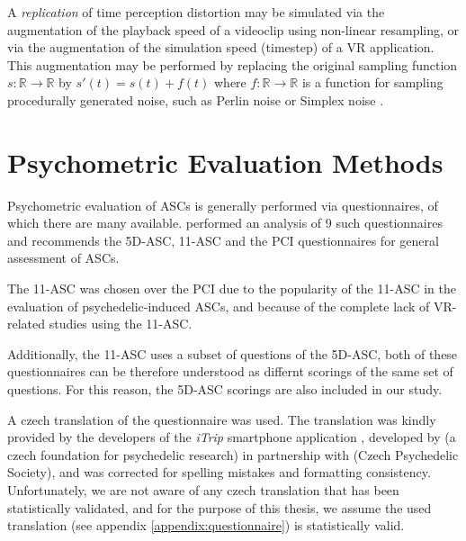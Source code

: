 A \textit{replication} of time perception distortion may be simulated via the augmentation of the playback speed of a videoclip using non-linear resampling, or via the augmentation of the simulation speed (timestep) of a \ac{VR} application. This augmentation may be performed by replacing the original sampling function $s \colon \mathbb{R} \to \mathbb{R}$ by $s'(t) = s(t) + f(t)$ where $f \colon \mathbb{R} \to \mathbb{R}$ is a function for sampling procedurally generated noise, such as Perlin noise \autocite{perlin1985image} or Simplex noise \autocite{olano2002simplex}.

\section{Psychometric Evaluation Methods}
Psychometric evaluation of \acp{ASC} is generally performed via questionnaires, of which there are many available.
\textcites{schmidt2018empirische}{figueiredobuilding} performed an analysis of 9 such questionnaires and recommends the \acf{5D-ASC}, \acf{11-ASC} and the \ac{PCI} questionnaires for general assessment of \acp{ASC}.

The \ac{11-ASC} was chosen over the \ac{PCI} due to the popularity of the \ac{11-ASC} in the evaluation of psychedelic-induced \acp{ASC}, and because of the complete lack of \ac{VR}-related studies using the \ac{11-ASC}.

Additionally, the \ac{11-ASC} uses a subset of questions of the \ac{5D-ASC}, both of these questionnaires can be therefore understood as differnt scorings of the same set of questions. For this reason, the \ac{5D-ASC} scorings are also included in our study.

A czech translation of the questionnaire was used. The translation was kindly provided by the developers of the \textit{iTrip} smartphone application \autocite{nimh2020itrip}, developed by  (a czech foundation for psychedelic research) in partnership with  (Czech Psychedelic Society), and was corrected for spelling mistakes and formatting consistency. Unfortunately, we are not aware of any czech translation that has been statistically validated, and for the purpose of this thesis, we assume the used translation (see appendix \ref{appendix:questionnaire}) is statistically valid.
